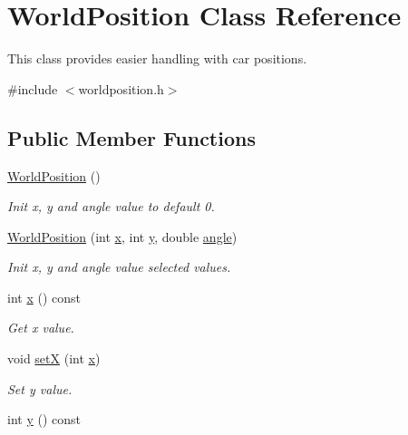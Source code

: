 \hypertarget{class_world_position}{}\section{World\+Position Class Reference}
\label{class_world_position}


This class provides easier handling with car positions.  




{\ttfamily \#include $<$worldposition.\+h$>$}

\subsection*{Public Member Functions}
\begin{DoxyCompactItemize}
\item 
\mbox{\hyperlink{class_world_position_ac85db09f51083bbf79de9eeec77fed4a}{World\+Position}} ()
\begin{DoxyCompactList}\small\item\em Init x, y and angle value to default 0. \end{DoxyCompactList}\item 
\mbox{\hyperlink{class_world_position_a7522fc742a5f1fe1111818d7f5e3248c}{World\+Position}} (int \mbox{\hyperlink{class_world_position_a76a7d3f5ce6324d8fff2e34d6759c77e}{x}}, int \mbox{\hyperlink{class_world_position_a27974b894b7f7ccc25ed8c27b05c79ac}{y}}, double \mbox{\hyperlink{class_world_position_af69b8ff7bd453f0e39a6a2deec64ef42}{angle}})
\begin{DoxyCompactList}\small\item\em Init x, y and angle value selected values. \end{DoxyCompactList}\item 
int \mbox{\hyperlink{class_world_position_a76a7d3f5ce6324d8fff2e34d6759c77e}{x}} () const
\begin{DoxyCompactList}\small\item\em Get x value. \end{DoxyCompactList}\item 
void \mbox{\hyperlink{class_world_position_a51676af1df78205bdfb48237ae91d935}{setX}} (int \mbox{\hyperlink{class_world_position_a76a7d3f5ce6324d8fff2e34d6759c77e}{x}})
\begin{DoxyCompactList}\small\item\em Set y value. \end{DoxyCompactList}\item 
int \mbox{\hyperlink{class_world_position_a27974b894b7f7ccc25ed8c27b05c79ac}{y}} () const

\end{DoxyCompactItemize}
